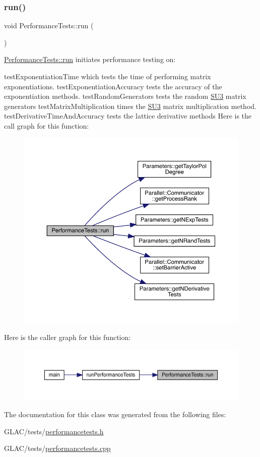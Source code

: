 \subsubsection{\texorpdfstring{run()}{run()}}
{\footnotesize\ttfamily void Performance\+Tests\+::run (\begin{DoxyParamCaption}{ }\end{DoxyParamCaption})}



\mbox{\hyperlink{class_performance_tests_aa55ebdbc84db93cc45adfdf7163f90b4}{Performance\+Tests\+::run}} initiates performance testing on\+: 

test\+Exponentiation\+Time which tests the time of performing matrix exponentiations. test\+Exponentiation\+Accuracy tests the accuracy of the exponentiation methods. test\+Random\+Generators tests the random \mbox{\hyperlink{class_s_u3}{S\+U3}} matrix generators test\+Matrix\+Multiplication times the \mbox{\hyperlink{class_s_u3}{S\+U3}} matrix multiplication method. test\+Derivative\+Time\+And\+Accuracy tests the lattice derivative methods Here is the call graph for this function\+:
\nopagebreak
\begin{figure}[H]
\begin{center}
\leavevmode
\includegraphics[width=350pt]{class_performance_tests_aa55ebdbc84db93cc45adfdf7163f90b4_cgraph}
\end{center}
\end{figure}
Here is the caller graph for this function\+:
\nopagebreak
\begin{figure}[H]
\begin{center}
\leavevmode
\includegraphics[width=350pt]{class_performance_tests_aa55ebdbc84db93cc45adfdf7163f90b4_icgraph}
\end{center}
\end{figure}


The documentation for this class was generated from the following files\+:\begin{DoxyCompactItemize}
\item 
G\+L\+A\+C/tests/\mbox{\hyperlink{performancetests_8h}{performancetests.\+h}}\item 
G\+L\+A\+C/tests/\mbox{\hyperlink{performancetests_8cpp}{performancetests.\+cpp}}\end{DoxyCompactItemize}
